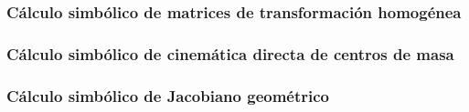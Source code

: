 \subsubsection{Cálculo simbólico de matrices de transformación homogénea} \label{cd:TH}


\subsubsection{Cálculo simbólico de cinemática directa de centros de masa} \label{cd:CD}


\subsubsection{Cálculo simbólico de Jacobiano geométrico} \label{cd:J}
